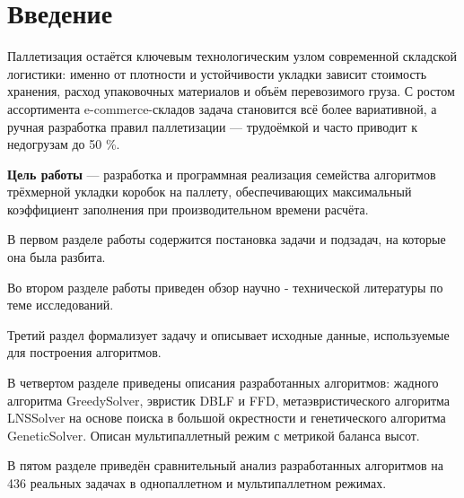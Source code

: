 \chapter*{Введение}
\label{cha:intro}

Паллетизация остаётся ключевым технологическим узлом современной складской логистики: именно от плотности и устойчивости укладки зависит стоимость хранения, расход упаковочных материалов и объём перевозимого груза. С ростом ассортимента e-commerce-складов задача становится всё более вариативной, а ручная разработка правил паллетизации — трудоёмкой и часто приводит к недогрузам до 50 \%.

\textbf{Цель работы} — разработка и программная реализация семейства алгоритмов трёхмерной укладки коробок на паллету, обеспечивающих максимальный коэффициент заполнения при производительном времени расчёта.

В первом разделе работы содержится постановка задачи  и подзадач, на которые она была разбита.

Во втором разделе работы приведен обзор научно - технической литературы по теме исследований.  

Третий раздел формализует задачу и описывает исходные данные, используемые для построения алгоритмов.
 
В четвертом разделе приведены описания разработанных алгоритмов: жадного алгоритма GreedySolver, эвристик DBLF и FFD, метаэвристического алгоритма LNSSolver на основе поиска в большой окрестности и генетического алгоритма GeneticSolver. Описан мультипаллетный режим с метрикой баланса высот.

В пятом разделе приведён сравнительный анализ разработанных алгоритмов на 436 реальных задачах в однопаллетном и мультипаллетном режимах.